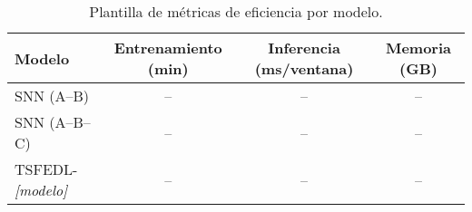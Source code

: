 \begin{table}[htbp]
\centering
\small
\begin{tabular}{lccc}
\hline\hline
\textbf{Modelo} & \textbf{Entrenamiento (min)} & \textbf{Inferencia (ms/ventana)} & \textbf{Memoria (GB)} \\
\hline
SNN (A--B) & -- & -- & -- \\
SNN (A--B--C) & -- & -- & -- \\
TSFEDL-\textit{[modelo]} & -- & -- & -- \\
\hline\hline
\end{tabular}
\caption{Plantilla de métricas de eficiencia por modelo.}
\label{tab:metricas-eficiencia}
\end{table}

